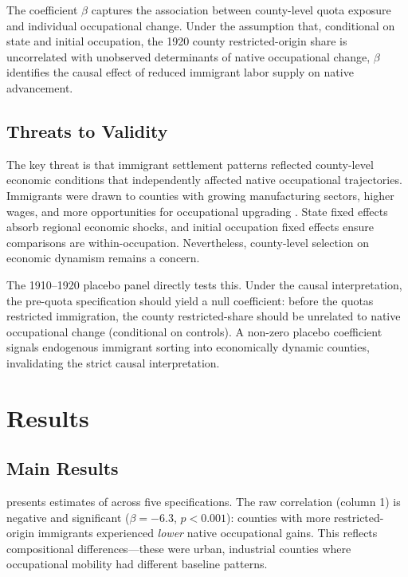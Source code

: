 \documentclass[12pt]{article}
\begin{document}
The coefficient $\beta$ captures the association between county-level quota exposure and individual occupational change. Under the assumption that, conditional on state and initial occupation, the 1920 county restricted-origin share is uncorrelated with unobserved determinants of native occupational change, $\beta$ identifies the causal effect of reduced immigrant labor supply on native advancement.

\subsection{Threats to Validity}

The key threat is that immigrant settlement patterns reflected county-level economic conditions that independently affected native occupational trajectories. Immigrants were drawn to counties with growing manufacturing sectors, higher wages, and more opportunities for occupational upgrading \citep{abramitzkyboustan2017}. State fixed effects absorb regional economic shocks, and initial occupation fixed effects ensure comparisons are within-occupation. Nevertheless, county-level selection on economic dynamism remains a concern.

The 1910--1920 placebo panel directly tests this. Under the causal interpretation, the pre-quota specification should yield a null coefficient: before the quotas restricted immigration, the county restricted-share should be unrelated to native occupational change (conditional on controls). A non-zero placebo coefficient signals endogenous immigrant sorting into economically dynamic counties, invalidating the strict causal interpretation.


\section{Results}
\label{sec:results}

\subsection{Main Results}

 presents estimates of  across five specifications. The raw correlation (column 1) is negative and significant ($\beta = -6.3$, $p < 0.001$): counties with more restricted-origin immigrants experienced \emph{lower} native occupational gains. This reflects compositional differences---these were urban, industrial counties where occupational mobility had different baseline patterns.
\end{document}
